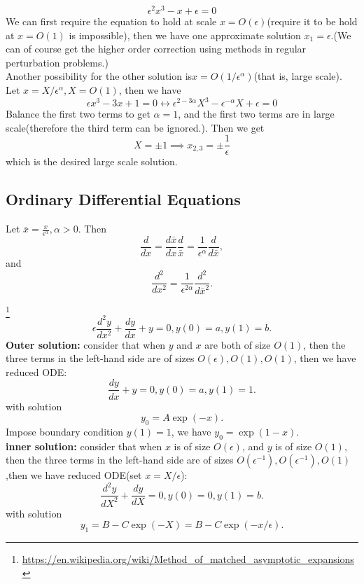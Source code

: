\begin{refsection}
\begin{example}\cite[29]{holmes2012introduction}
	$$\epsilon^2 x^3 - x + \epsilon = 0$$
	We can first require the equation to hold at scale $x = O(\epsilon)$(require it to be hold at $x=O(1)$ is impossible), then we have one approximate solution $x_1 = \epsilon$.(We can of course get the higher order correction using methods in regular perturbation problems.)\\
	
	Another possibility for the other solution is$x  = O(1/\epsilon^\alpha)$(that is, large scale). Let $x = X/\epsilon^\alpha, X=O(1)$, then we have
	$$\epsilon x^3 - 3x + 1= 0 \leftrightarrow \epsilon^{2-3\alpha}X^3 - \epsilon^{-\alpha}X + \epsilon = 0$$
	Balance the first two terms to get $\alpha = 1$, and the first two terms are in large scale(therefore the third term can be ignored.). Then we get 
	$$X= \pm 1 \implies x_{2,3} = \pm \frac{1}{\epsilon}$$
	which is the desired large scale solution. 
\end{example}


\subsection{Ordinary Differential Equations}
\begin{lemma}\label{ch:multiscale-modeling:th:changeofscale}
	Let $\bar{x} = \frac{x}{\epsilon^\alpha}, \alpha > 0$. Then
	$$\frac{d}{dx} = \frac{d \bar{x}}{dx}\frac{d}{\bar{x}} = \frac{1}{\epsilon^\alpha} \frac{d}{d \bar{x}},$$
	and
	$$\frac{d^2}{dx^2} = \frac{1}{\epsilon^{2\alpha}} \frac{d^2}{d \bar{x}^2}.$$
\end{lemma}
\begin{example}\footnote{\url{https://en.wikipedia.org/wiki/Method_of_matched_asymptotic_expansions}}
	$$\epsilon \frac{d^2 y}{dx^2} + \frac{d y}{dx} + y = 0, y(0) = a, y(1) = b.$$
\textbf{Outer solution:} consider that when $y$ and $x$ are both of size $O(1)$, then the three terms in the left-hand side are of sizes $O(\epsilon), O(1), O(1)$, then we have reduced ODE:
$$\frac{d y}{dx} + y = 0, y(0) = a, y(1) = 1.$$
with solution
$$y_0 = A\exp(-x).$$
Impose boundary condition $y(1) = 1$, we have $y_0 = \exp(1-x)$.\\

\textbf{inner solution:} consider that when $x$ is of size $O(\epsilon)$, and $y$ is of size $O(1)$, then the three terms in the left-hand side are of sizes $O(\epsilon^{-1}), O(\epsilon^{-1}), O(1)$,then we have reduced ODE(set $x = X/\epsilon$):
$$\frac{d^2 y}{dX^2} + \frac{d y}{dX} = 0, y(0) = 0, y(1) = b.$$
with solution
$$y_1 = B - C\exp(-X) = B - C\exp(-x/\epsilon).$$


\end{example}
\end{refsection}
